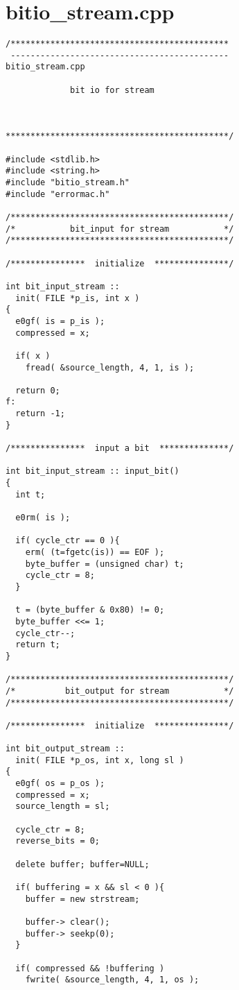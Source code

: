 \section{bitio\_stream.cpp}
\begin{verbatim}
/********************************************
 --------------------------------------------
bitio_stream.cpp

             bit io for stream



*********************************************/

#include <stdlib.h>
#include <string.h>
#include "bitio_stream.h"
#include "errormac.h"

/********************************************/
/*           bit_input for stream           */
/********************************************/

/***************  initialize  ***************/

int bit_input_stream ::
  init( FILE *p_is, int x )
{
  e0gf( is = p_is );
  compressed = x;

  if( x )
    fread( &source_length, 4, 1, is );

  return 0;
f:
  return -1;
}

/***************  input a bit  **************/

int bit_input_stream :: input_bit()
{
  int t;

  e0rm( is );

  if( cycle_ctr == 0 ){
    erm( (t=fgetc(is)) == EOF );
    byte_buffer = (unsigned char) t;
    cycle_ctr = 8;
  }

  t = (byte_buffer & 0x80) != 0;
  byte_buffer <<= 1;
  cycle_ctr--;
  return t;
}

/********************************************/
/*          bit_output for stream           */
/********************************************/

/***************  initialize  ***************/

int bit_output_stream ::
  init( FILE *p_os, int x, long sl )
{
  e0gf( os = p_os );
  compressed = x;
  source_length = sl;

  cycle_ctr = 8;
  reverse_bits = 0;

  delete buffer; buffer=NULL;

  if( buffering = x && sl < 0 ){
    buffer = new strstream;

    buffer-> clear();
    buffer-> seekp(0);
  }

  if( compressed && !buffering )
    fwrite( &source_length, 4, 1, os );


\end{verbatim}
